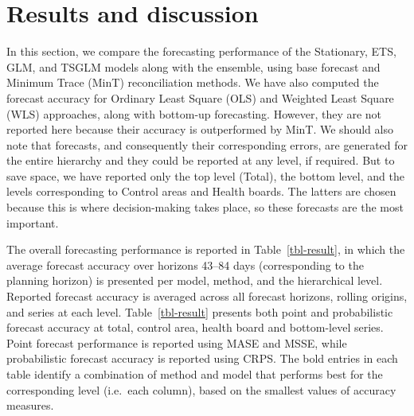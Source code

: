 \documentclass[
  authoryear,
  preprint,
  3p]{elsarticle}
\begin{document}
\section{Results and discussion}\label{sec-results}

In this section, we compare the forecasting performance of the
Stationary, ETS, GLM, and TSGLM models along with the ensemble, using
base forecast and Minimum Trace (MinT) reconciliation methods. We have
also computed the forecast accuracy for Ordinary Least Square (OLS) and
Weighted Least Square (WLS) approaches, along with bottom-up
forecasting. However, they are not reported here because their accuracy
is outperformed by MinT. We should also note that forecasts, and
consequently their corresponding errors, are generated for the entire
hierarchy and they could be reported at any level, if required. But to
save space, we have reported only the top level (Total), the bottom
level, and the levels corresponding to Control areas and Health boards.
The latters are chosen because this is where decision-making takes
place, so these forecasts are the most important.

The overall forecasting performance is reported in
Table~\ref{tbl-result}, in which the average forecast accuracy over
horizons 43--84 days (corresponding to the planning horizon) is
presented per model, method, and the hierarchical level. Reported
forecast accuracy is averaged across all forecast horizons, rolling
origins, and series at each level. Table~\ref{tbl-result} presents both
point and probabilistic forecast accuracy at total, control area, health
board and bottom-level series. Point forecast performance is reported
using MASE and MSSE, while probabilistic forecast accuracy is reported
using CRPS. The bold entries in each table identify a combination of
method and model that performs best for the corresponding level
(i.e.~each column), based on the smallest values of accuracy measures.
\end{document}
